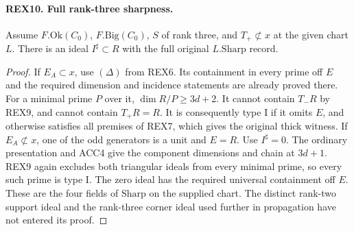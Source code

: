 \paragraph{REX10. Full rank-three sharpness.}
\label{claim:REX10}
Assume \(F.\mathrm{Ok}(C_0)\), \(F.\mathrm{Big}(C_0)\),
\(S\) of rank three, and \(T_+\not\subset x\) at the given chart
\(L\). There is an ideal \(I^\sharp\subset R\) with the full
original \(L.\mathrm{Sharp}\) record.
\begin{proof}
If \(E_A\subset x\), use \((\Delta)\) from REX6. Its containment
in every prime off \(E\) and the required dimension and incidence
statements are already proved there. For a minimal prime \(P\)
over it, \(\dim R/P\ge3d+2\). It cannot contain \(T_-R\)
by REX9, and cannot contain \(T_+R=R\). It is consequently type I
if it omits \(E\), and otherwise satisfies all premises of REX7,
which gives the original thick witness. If \(E_A\not\subset x\),
one of the odd generators is a unit and \(E=R\). Use \(I^\sharp=0\).
The ordinary presentation and ACC4 give the component dimensions
and chain at \(3d+1\). REX9 again excludes both triangular ideals
from every minimal prime, so every such prime is type I. The
zero ideal has the required universal containment off \(E\).
These are the four fields of \(\mathrm{Sharp}\) on the supplied
chart. The distinct rank-two support ideal and the rank-three
corner ideal used further in propagation have not entered its proof.
\end{proof}
